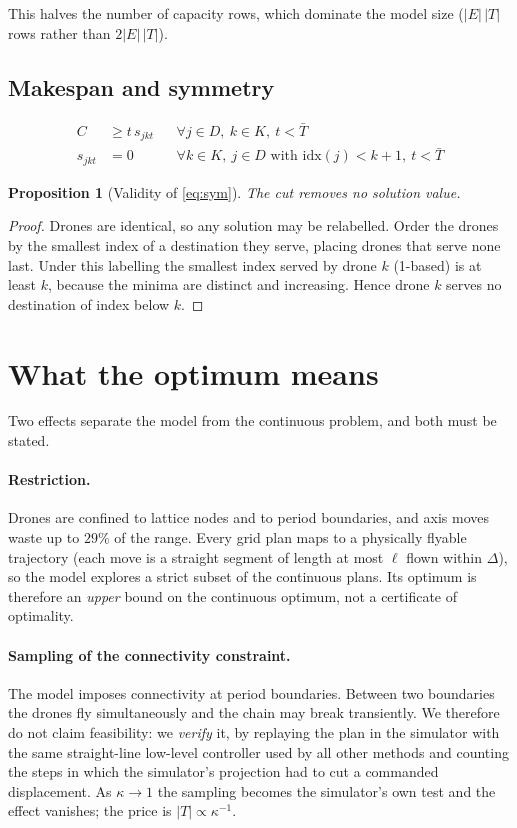 \documentclass[11pt]{article}
\newtheorem{proposition}{Proposition}
\begin{document}
This halves the number of capacity rows, which dominate the model size
($|E|\,|T|$ rows rather than $2|E|\,|T|$).

\subsection{Makespan and symmetry}

\begin{align}
C &\ge t\, s_{jkt} && \forall j \in D,\ k \in K,\ t < \bar{T} \label{eq:mk}\\
s_{jkt} &= 0 && \forall k \in K,\ j \in D \text{ with } \mathrm{idx}(j) < k+1,\ t < \bar{T} \label{eq:sym}
\end{align}

\begin{proposition}[Validity of \eqref{eq:sym}]
The cut removes no solution value. 
\end{proposition}

\begin{proof}
Drones are identical, so any solution may be relabelled. Order the drones by the smallest
index of a destination they serve, placing drones that serve none last. Under this labelling
the smallest index served by drone $k$ (1-based) is at least $k$, because the minima are
distinct and increasing. Hence drone $k$ serves no destination of index below $k$.
\end{proof}

\section{What the optimum means}

Two effects separate the model from the continuous problem, and both must be stated.

\paragraph{Restriction.} Drones are confined to lattice nodes and to period boundaries, and
axis moves waste up to $29\%$ of the range. Every grid plan maps to a physically flyable
trajectory (each move is a straight segment of length at most $\ell$ flown within $\Delta$),
so the model explores a strict subset of the continuous plans. Its optimum is therefore an
\emph{upper} bound on the continuous optimum, not a certificate of optimality.

\paragraph{Sampling of the connectivity constraint.} The model imposes connectivity at period
boundaries. Between two boundaries the drones fly simultaneously and the chain may break
transiently. We therefore do not claim feasibility: we \emph{verify} it, by replaying the
plan in the simulator with the same straight-line low-level controller used by all other
methods and counting the steps in which the simulator's projection had to cut a commanded
displacement. As $\kappa \to 1$ the sampling becomes the simulator's own test and the effect
vanishes; the price is $|T| \propto \kappa^{-1}$.
\end{document}
